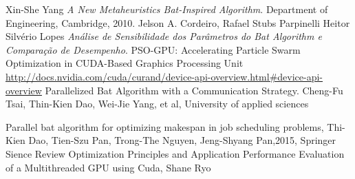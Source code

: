 \documentclass[conference]{IEEEtran}
\begin{document}
\begin{thebibliography}{1}

    Xin-She Yang \emph{A New Metaheuristics Bat-Inspired Algorithm}. Department of Engineering, Cambridge, 2010.
    Jelson A. Cordeiro, Rafael Stubs Parpinelli Heitor Silvério Lopes \emph{Análise de Sensibilidade dos Parâmetros do Bat Algorithm e Comparação de Desempenho}.
    PSO-GPU: Accelerating Particle Swarm Optimization in CUDA-Based Graphics Processing Unit
    \url{http://docs.nvidia.com/cuda/curand/device-api-overview.html#device-api-overview}
    Parallelized Bat Algorithm with a Communication Strategy. Cheng-Fu Tsai, Thin-Kien Dao, Wei-Jie Yang, et al, University of applied sciences

    Parallel bat algorithm for optimizing makespan in job scheduling problems, Thi-Kien Dao, Tien-Szu Pan, Trong-The Nguyen, Jeng-Shyang Pan,2015, Springer Sience Review
    Optimization Principles and Application Performance Evaluation of a Multithreaded GPU using Cuda, Shane Ryo

\end{thebibliography}
\end{document}
